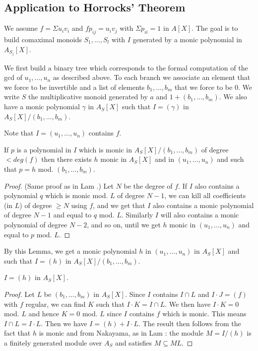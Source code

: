 \subsection{Application to Horrocks' Theorem}

We assume $f = \Sigma u_iv_i$ and $fp_{ij} = u_iv_j$ with $\Sigma p_{ii} = 1$
in $A[X]$. The goal is to build comaximal monoids $S_1,\dots,S_l$ with $I$ generated by
a monic polynomial in $A_{S_j}[X]$.

We first build a binary tree which corresponds to the formal computation of the gcd of
$u_1,\dots,u_n$ as described above. To each branch we associate an element that
we force to be invertible and a list of elements $b_1,\dots,b_m$ that we force to be $0$.
We write $S$ the multiplicative monoid generated by $a$ and $1 + (b_1,\dots,b_m)$.
We also have a monic polynomial $\gamma$ in $A_S[X]$ 
such that $I = (\gamma)$ in $A_S[X]/(b_1,\dots,b_m)$.

 Note that $I = (u_1,\dots,u_n)$ contains $f$.

\begin{lemma}
  If $p$ is a polynomial in $I$ which is monic in $A_S[X]/(b_1,\dots,b_m)$ of degree $<deg(f)$
  then there exists $h$ monic in
  $A_S[X]$ and in $(u_1,\dots,u_n)$ and such that $p=h$ mod. $(b_1,\dots,b_m)$.
\end{lemma}

\begin{proof}
  (Same proof as in Lam \cite{Lam}.) Let $N$ be the degree of $f$.
  If $I$ also contains a polynomial $q$ which is monic
  mod. $L$ of degree $N-1$, we can kill all coefficients (in $L$) of degree $\geqslant N$
  using $f$, and we get that $I$ also contains a monic polynomial of degree $N-1$
  and equal to $q$ mod. $L$.
  Similarly $I$ will also contains a monic polynomial of degree $N-2$, and so on, until
  we get $h$ monic in $(u_1,\dots,u_n)$ and equal to $p$ mod. $L$.
\end{proof}

By this Lemma, we get a monic polynomial $h$ in $(u_1,\dots,u_n)$ in $A_S[X]$
and such that $I=(h)$ in $A_S[X]/(b_1,\dots,b_m)$.

\begin{lemma}
 $I = (h)$ in $A_{S}[X]$.
\end{lemma}

\begin{proof}
  Let $L$ be $(b_1,\dots,b_m)$ in $A_S[X]$.
  Since $I$ contains $I\cap L$ and $I\cdot J = (f)$ with $f$ regular, we can find $K$
  such that $I\cdot K = I\cap L$.
  We then have $I\cdot K = 0$ mod. $L$ and hence $K = 0$ mod. $L$ since $I$ contains $f$
  which is monic.
  This means $I\cap L = I\cdot L$. Then we have $I = (h) + I\cdot L$.
  The result then follows from the fact that $h$ is monic and from Nakayama, as in Lam \cite{Lam}:
  the module $M = I/(h)$ is a finitely generated module over $A_S$ and satisfies
  $M\subseteq ML$.
\end{proof}

